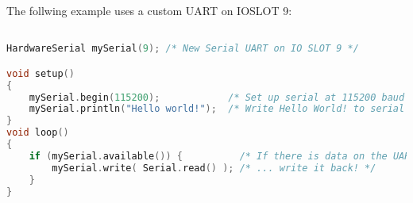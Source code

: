 The follwing example uses a custom UART on IOSLOT 9:

\begin{lstlisting}[language=C++]

HardwareSerial mySerial(9); /* New Serial UART on IO SLOT 9 */

void setup()
{
    mySerial.begin(115200);            /* Set up serial at 115200 baud */
    mySerial.println("Hello world!");  /* Write Hello World! to serial */
}
void loop()
{
    if (mySerial.available()) {          /* If there is data on the UART... */
        mySerial.write( Serial.read() ); /* ... write it back! */
    }
}
\end{lstlisting}

